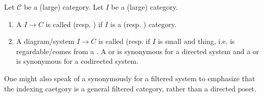 \begin{definition} \label{definition:system_in_a_category_indexed_by_a_directed_poset}
Let $\mathcal{C}$ be a (large) category. Let $I$ be a (large) category. 
\begin{enumerate}
   \item A  $I \to C$ is called  (resp. ) if $I$ is a  (resp. ) category.

    \item A diagram/system $I \to C$ is called  (resp.  if $I$ is small and thing, i.e. is regardable/comes from a . A  or  is synonymous for a directed system and a  or  is synonymous for a codirected system.
\end{enumerate}
One might also speak of a  synonymously for a filtered system to emphasize that the indexing caetgory is a general filtered category, rather than a directed poset.
\end{definition}
